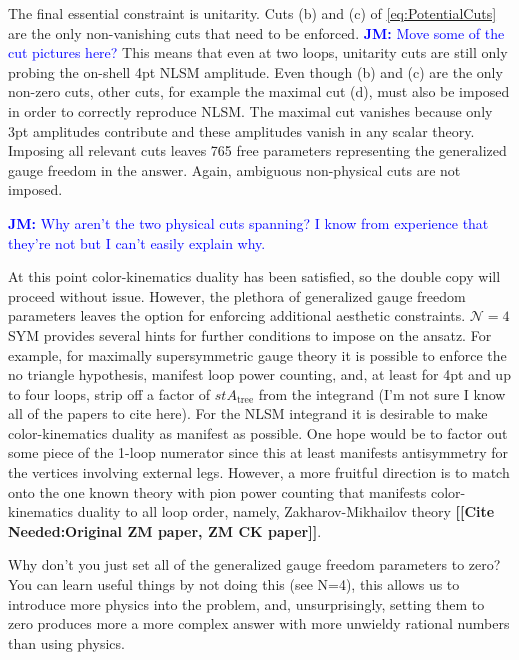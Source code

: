 \documentclass[11pt,letter]{article}
\newcommand{\jm}[1]{\textcolor{blue}{\textbf{JM: }{#1}}}
\newcommand{\citepls}[1]{{\bf\color{red}[[Cite Needed:#1]]}}
\begin{document}
The final essential constraint is unitarity.
Cuts (b) and (c) of \cref{eq:PotentialCuts} are the only non-vanishing cuts that need to be enforced.  \jm{Move some of the cut pictures here?}
This means that even at two loops, unitarity cuts are still only probing the on-shell 4pt NLSM amplitude.
Even though (b) and (c) are the only non-zero cuts, other cuts, for example the maximal cut (d), must also be imposed in order to correctly reproduce NLSM.
The maximal cut vanishes because only 3pt amplitudes contribute and these amplitudes vanish in any scalar theory.
Imposing all relevant cuts leaves 765 free parameters representing the generalized gauge freedom in the answer.
Again, ambiguous non-physical cuts are not imposed.

\jm{Why aren't the two physical cuts spanning?  I know from experience that they're not but I can't easily explain why.}

At this point color-kinematics duality has been satisfied, so the double copy will proceed without issue.
However, the plethora of generalized gauge freedom parameters leaves the option for enforcing additional aesthetic constraints.
$\mathcal{N}=4$ SYM provides several hints for further conditions to impose on the ansatz.
For example, for maximally supersymmetric gauge theory it is possible to enforce the no triangle hypothesis, manifest loop power counting, and, at least for 4pt and up to four loops, strip off a factor of $st A_\text{tree}$ from the integrand (I'm not sure I know all of the papers to cite here).
For the NLSM integrand it is desirable to make color-kinematics duality as manifest as possible.
One hope would be to factor out some piece of the 1-loop numerator since this at least manifests antisymmetry for the vertices involving external legs.
However, a more fruitful direction is to match onto the one known theory with pion power counting that manifests color-kinematics duality to all loop order, namely, Zakharov-Mikhailov theory \citepls{Original ZM paper, ZM CK paper}.

Why don't you just set all of the generalized gauge freedom parameters to zero?
You can learn useful things by not doing this (see N=4), this allows us to introduce more physics into the problem, and, unsurprisingly, setting them to zero produces more a more complex answer with more unwieldy rational numbers than using physics.
\end{document}
